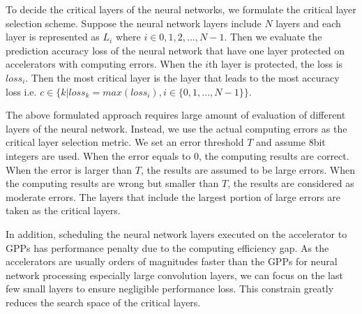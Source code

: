 To decide the critical layers of the neural networks, we formulate the 
critical layer selection scheme. Suppose the neural network layers include 
$N$ layers and each layer is represented as $L_i$ where $i \in {0, 1, 2, ..., N-1}$.
Then we evaluate the prediction accuracy loss of the neural network 
that have one layer protected on accelerators with computing errors.
When the $i$th layer is protected, the loss is $loss_i$.
Then the most critical layer is the layer that leads to the most 
accuracy loss i.e. $c \in \{k|loss_k = max(loss_i), i \in \{0, 1, ..., N-1\}\}$.

The above formulated approach requires large amount of evaluation of 
different layers of the neural network. Instead, we use the actual 
computing errors as the critical layer selection metric. We set an 
error threshold $T$ and assume 8bit integers are used. 
When the error equals to 0, the computing results are correct. 
When the error is larger than $T$, the results are assumed to be large errors.
When the computing results are wrong but smaller than $T$, the results are considered 
as moderate errors. The layers that include the largest portion of large errors 
are taken as the critical layers.

In addition, scheduling the neural network layers executed 
on the accelerator to GPPs has performance penalty due to the 
computing efficiency gap. As the accelerators are usually 
orders of magnitudes faster than the GPPs for neural network 
processing especially large convolution layers, we can focus on 
the last few small layers to ensure negligible performance 
loss. This constrain greatly reduces the search space
of the critical layers. 


